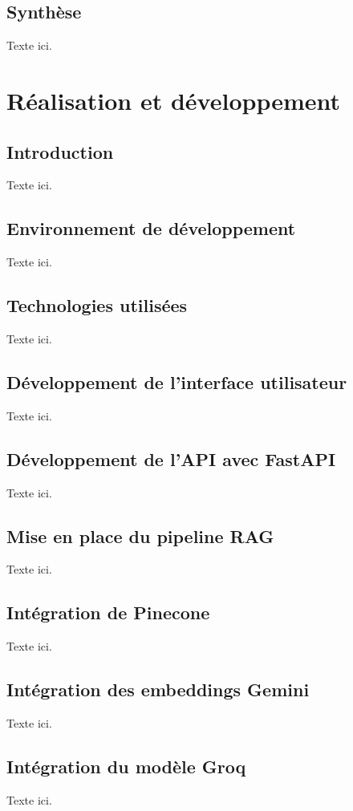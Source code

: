 \documentclass[12pt,a4paper]{report}
\begin{document}
\section{Synthèse}
Texte ici.

\chapter{Réalisation et développement}

\section{Introduction}
Texte ici.

\section{Environnement de développement}
Texte ici.

\section{Technologies utilisées}
Texte ici.

\section{Développement de l'interface utilisateur}
Texte ici.

\section{Développement de l'API avec FastAPI}
Texte ici.

\section{Mise en place du pipeline RAG}
Texte ici.

\section{Intégration de Pinecone}
Texte ici.

\section{Intégration des embeddings Gemini}
Texte ici.

\section{Intégration du modèle Groq}
Texte ici.
\end{document}
